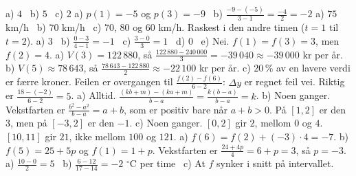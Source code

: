 
 a) $4$ \ b) $5$ \ c) $2$
 a) $p(1) = -5$ og $p(3) = -9$ \ b) $\frac{-9 - (-5)}{3 - 1} = \frac{-4}{2} = -2$
 a) $75$ km/h \ b) $70$ km/h \ c) $70$, $80$ og $60$ km/h. Raskest i den andre timen ($t = 1$ til $t = 2$).
 a) $3$ \ b) $\frac{0 - 3}{4 - 1} = -1$ \ c) $\frac{3 - 0}{3} = 1$ \ d) $0$ \ e) Nei. $f(1) = f(3) = 3$, men $f(2) = 4$.
 a) $V(3) = 122\,880$, så $\frac{122\,880 - 240\,000}{3} = -39\,040 \approx -39\,000$ kr per år.
b) $V(5) \approx 78\,643$, så $\frac{78\,643 - 122\,880}{2} \approx -22\,100$ kr per år.
c) $20\,\%$ av en lavere verdi er færre kroner.
 Feilen er overgangen til $\frac{f(2) - f(6)}{6 - 2}$: $\Delta y$ er regnet feil vei. Riktig er $\frac{18 - (-2)}{6 - 2} = 5$.
 a) Alltid. $\frac{(kb + m) - (ka + m)}{b - a} = \frac{k(b - a)}{b - a} = k$.
b) Noen ganger. Vekstfarten er $\frac{b^2 - a^2}{b - a} = a + b$, som er positiv bare når $a + b > 0$. På $[1, 2]$ er den $3$, men på $[-3, 2]$ er den $-1$.
c) Noen ganger. $[0, 2]$ gir $2$, mellom $0$ og $4$. $[10, 11]$ gir $21$, ikke mellom $100$ og $121$.
 a) $f(6) = f(2) + (-3) \cdot 4 = -7$.
b) $f(5) = 25 + 5p$ og $f(1) = 1 + p$. Vekstfarten er $\frac{24 + 4p}{4} = 6 + p = 3$, så $p = -3$.
 a) $\frac{10 - 0}{2} = 5$ \ b) $\frac{6 - 12}{17 - 14} = -2$ $^\circ$C per time \ c) At $f$ synker i snitt på intervallet.

